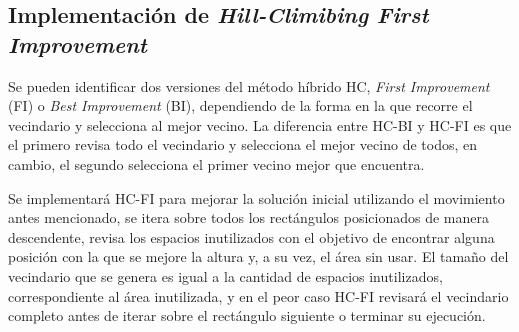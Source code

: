 \documentclass[letter, 10pt]{article}
\begin{document}
\subsection{Implementaci\'on de \emph{Hill-Climibing First Improvement}}

Se pueden identificar dos versiones del m\'etodo h\'ibrido HC, \emph{First Improvement} (FI) o \emph{Best Improvement} (BI), dependiendo de la forma en la que recorre el vecindario y selecciona al mejor vecino. La diferencia entre HC-BI y HC-FI es que el primero revisa todo el vecindario y selecciona el mejor vecino de todos, en cambio, el segundo selecciona el primer vecino mejor que encuentra.

Se implementar\'a HC-FI para mejorar la soluci\'on inicial utilizando el movimiento antes mencionado, se itera sobre todos los rect\'angulos posicionados de manera descendente, revisa los espacios inutilizados con el objetivo de encontrar alguna posici\'on con la que se mejore la altura y, a su vez, el \'area sin usar. El tama\~no del vecindario que se genera es igual a la cantidad de espacios inutilizados, correspondiente al \'area inutilizada, y en el peor caso HC-FI revisar\'a el vecindario completo antes de iterar sobre el rect\'angulo siguiente o terminar su ejecuci\'on.
\vspace{0.2cm}
\end{document}
